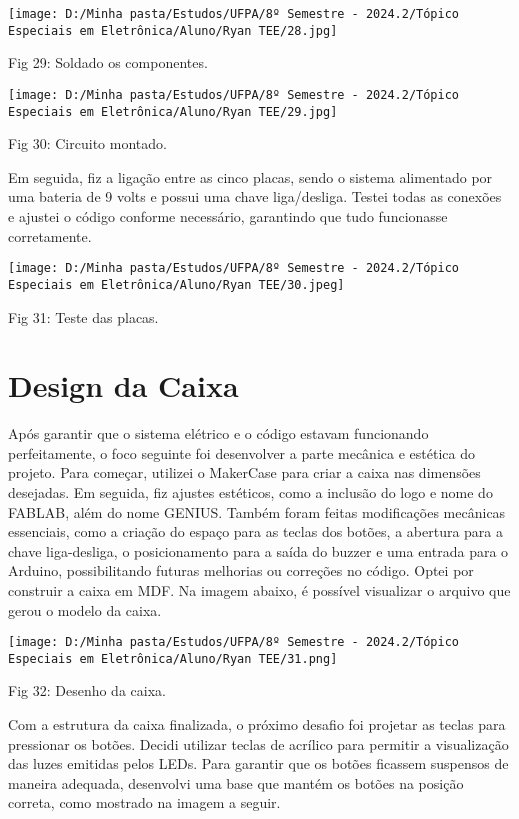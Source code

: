 \documentclass[
]{book}
\begin{document}
\texttt{[image: D:/Minha pasta/Estudos/UFPA/8º Semestre - 2024.2/Tópico Especiais em Eletrônica/Aluno/Ryan TEE/28.jpg]}

Fig 29: Soldado os componentes.

\texttt{[image: D:/Minha pasta/Estudos/UFPA/8º Semestre - 2024.2/Tópico Especiais em Eletrônica/Aluno/Ryan TEE/29.jpg]}

Fig 30: Circuito montado.

Em seguida, fiz a ligação entre as cinco placas, sendo o sistema alimentado por uma bateria de 9 volts e possui uma chave liga/desliga. Testei todas as conexões e ajustei o código conforme necessário, garantindo que tudo funcionasse corretamente.

\texttt{[image: D:/Minha pasta/Estudos/UFPA/8º Semestre - 2024.2/Tópico Especiais em Eletrônica/Aluno/Ryan TEE/30.jpeg]}

Fig 31: Teste das placas.

\section{Design da Caixa}\label{design-da-caixa}

Após garantir que o sistema elétrico e o código estavam funcionando perfeitamente, o foco seguinte foi desenvolver a parte mecânica e estética do projeto. Para começar, utilizei o MakerCase para criar a caixa nas dimensões desejadas. Em seguida, fiz ajustes estéticos, como a inclusão do logo e nome do FABLAB, além do nome GENIUS. Também foram feitas modificações mecânicas essenciais, como a criação do espaço para as teclas dos botões, a abertura para a chave liga-desliga, o posicionamento para a saída do buzzer e uma entrada para o Arduino, possibilitando futuras melhorias ou correções no código. Optei por construir a caixa em MDF. Na imagem abaixo, é possível visualizar o arquivo que gerou o modelo da caixa.

\texttt{[image: D:/Minha pasta/Estudos/UFPA/8º Semestre - 2024.2/Tópico Especiais em Eletrônica/Aluno/Ryan TEE/31.png]}

Fig 32: Desenho da caixa.

Com a estrutura da caixa finalizada, o próximo desafio foi projetar as teclas para pressionar os botões. Decidi utilizar teclas de acrílico para permitir a visualização das luzes emitidas pelos LEDs. Para garantir que os botões ficassem suspensos de maneira adequada, desenvolvi uma base que mantém os botões na posição correta, como mostrado na imagem a seguir.
\end{document}
